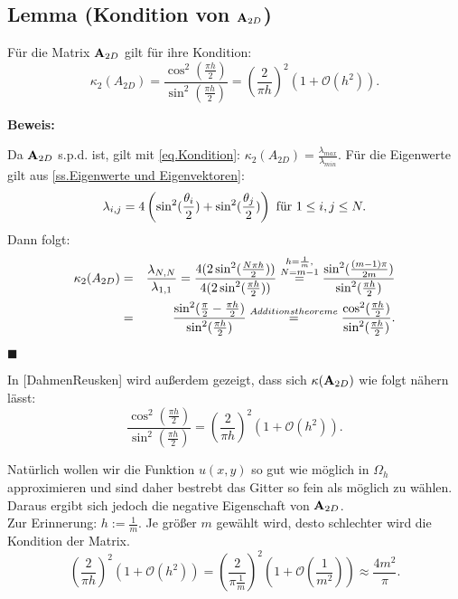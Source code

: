 \subsection{Lemma (Kondition von ${\textbf{A}}_{2D}$)}\label{ss.Matrixkondition}

Für die Matrix ${\textbf{A}}_{2D}$ gilt für ihre Kondition:
\begin{equation}
\kappa_{2} (A_{2D}) = \frac {\cos^{2}(\frac{\pi h}{2})} {\sin^{2}(\frac{\pi h}{2})} = \left( \frac {2} {\pi h} \right)^{2} (1 + \mathcal{O}(h^{2})).
\end{equation}

\textbf{Beweis:}

Da ${\textbf{A}}_{2D}$ s.p.d. ist, gilt mit \autoref{eq.Kondition}: $\kappa_{2} (A_{2D}) = \frac {\lambda_{max}} {\lambda_{min}}$. Für die Eigenwerte gilt aus \autoref{ss.Eigenwerte und Eigenvektoren}:
\begin{equation}
\lambda_{i,j} = 4 \left(\sin^{2}(\frac {\theta_{i}} {2}) + \sin^{2}(\frac {\theta_{j}} {2}) \right) \textnormal{ für } 1 \le i,j \le N. \notag
\end{equation}
Dann folgt:
\begin{eqnarray}
\kappa_{2} (A_{2D}) &=& \frac {\lambda_{N,N}} {\lambda_{1,1}} = \frac {4(2\sin^{2}(\frac {N \pi h} {2}))} {4(2\sin^{2}(\frac {\pi h} {2}))} \overset{\substack{h=\frac {1} {m}, \\ N=m-1}}{=} \frac {\sin^{2}(\frac {(m-1) \pi} {2m})} {\sin^{2}(\frac {\pi h} {2})} \notag \\
&=& \frac {\sin^{2} (\frac {\pi} {2} - \frac {\pi h} {2})} {\sin^{2} (\frac {\pi h} {2})} \overset{Additionstheoreme}{=} \frac {\cos^{2} (\frac {\pi h} {2})} {\sin^{2} (\frac {\pi h} {2})}. \notag
\end{eqnarray}
\begin{flushright}
$\blacksquare$
\end{flushright}
In [DahmenReusken] wird außerdem gezeigt, dass sich $\kappa({\textbf{A}}_{2D})$ wie folgt nähern lässt:
\begin{equation}
\frac {\cos^{2} (\frac {\pi h} {2})} {\sin^{2} (\frac {\pi h} {2})} = \left( \frac {2} {\pi h} \right)^{2} (1 + \mathcal{O}(h^{2})).
\end{equation}

Natürlich wollen wir die Funktion $u(x,y)$ so gut wie möglich in $\Omega_{h}$ approximieren und sind daher bestrebt das Gitter so fein als möglich zu wählen. Daraus ergibt sich jedoch die negative Eigenschaft von ${\textbf{A}}_{2D}$. \\
Zur Erinnerung: $h := \frac {1} {m}$. Je größer $m$ gewählt wird, desto schlechter wird die Kondition der Matrix.
\begin{equation}
\left( \frac {2} {\pi h} \right)^{2} (1 + \mathcal{O}(h^{2})) = \left( \frac {2} {\pi \frac {1} {m}} \right)^{2} (1 + \mathcal{O}(\frac {1} {m^{2}})) \approx \frac {4m^{2}} {\pi}.
\end{equation}

